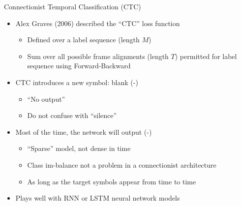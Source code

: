 \begin{frame}{Connectionist Temporal Classification (CTC)}
  \begin{itemize}
  \item Alex Graves (2006) described the ``CTC'' loss function
    \begin{itemize}
    \item Defined over a label sequence (length $M$)
    \item Sum over all possible frame alignments (length $T$) permitted for label sequence using Forward-Backward
    \end{itemize}
  \item CTC introduces a new symbol: blank (-)
    \begin{itemize}
    \item ``No output''
    \item Do not confuse with ``silence''
    \end{itemize}
  \item Most of the time, the network will output (-)
    \begin{itemize}
    \item ``Sparse'' model, not dense in time
    \item Class im-balance not a problem in a connectionist architecture
    \item As long as the target symbols appear from time to time
    \end{itemize}
  \item Plays well with RNN or LSTM neural network models
  \end{itemize}
\end{frame}

